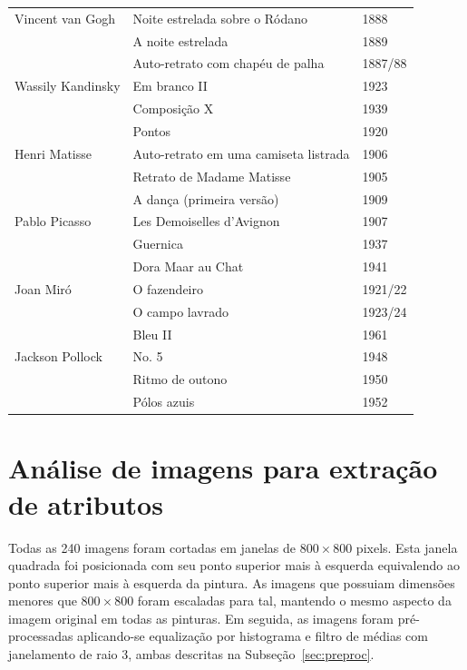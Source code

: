 \begin{table}
\begin{center}
\begin{tabular}{l|l|l}
Vincent van Gogh    & Noite estrelada sobre o Ródano & 1888 \\
                    & A noite estrelada & 1889 \\
                    & Auto-retrato com chapéu de palha & 1887/88 \\

Wassily Kandinsky   & Em branco II & 1923 \\
                    & Composição X & 1939 \\
                    & Pontos & 1920 \\

Henri Matisse       & Auto-retrato em uma camiseta listrada & 1906 \\
                    & Retrato de Madame Matisse & 1905 \\
                    & A dança (primeira versão) & 1909 \\

Pablo Picasso       & Les Demoiselles d'Avignon & 1907 \\
                    & Guernica & 1937 \\
                    & Dora Maar au Chat & 1941 \\

Joan Mir\'{o}       & O fazendeiro & 1921/22 \\
                    & O campo lavrado & 1923/24 \\
                    & Bleu II & 1961 \\

Jackson Pollock     & No. 5 & 1948 \\
                    & Ritmo de outono & 1950 \\
                    & Pólos azuis & 1952 \\

\hline
\end{tabular}
\end{center}
\end{table}


\section{Análise de imagens para extração de atributos}

Todas as 240 imagens foram cortadas em janelas de $800\times800$
pixels. Esta janela quadrada foi posicionada com seu ponto superior mais à
esquerda equivalendo ao ponto superior mais à esquerda da pintura. As imagens
que possuiam dimensões menores que $800\times800$ foram escaladas para tal, mantendo o
mesmo aspecto da imagem original em todas as pinturas. Em seguida, as
imagens foram pré-processadas aplicando-se equalização por histograma e filtro
de médias com janelamento de raio 3, ambas descritas na Subseção~\ref{sec:preproc}.

